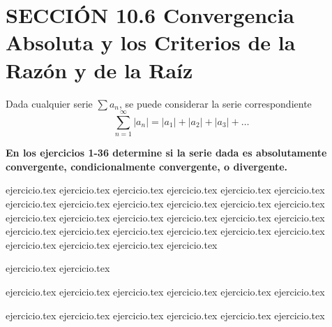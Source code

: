 
\section*{SECCIÓN 10.6 \quad Convergencia Absoluta y los Criterios de la Razón y de la Raíz}

Dada cualquier serie $\sum a_n$, se puede considerar la serie correspondiente
\[ \sum_{n=1}^{\infty} |a_n| = |a_1| + |a_2| + |a_3| + \dots \]

\vspace{0.5cm}
\noindent\textbf{En los ejercicios 1-36 determine si la serie dada es absolutamente convergente, condicionalmente convergente, o divergente.}
\begin{enumerate}
    {ejercicio.tex}
{ejercicio.tex}
{ejercicio.tex}
{ejercicio.tex}
{ejercicio.tex}
{ejercicio.tex}
{ejercicio.tex}
{ejercicio.tex}
{ejercicio.tex}
{ejercicio.tex}
{ejercicio.tex}
{ejercicio.tex}
{ejercicio.tex}
{ejercicio.tex}
{ejercicio.tex}
{ejercicio.tex}
{ejercicio.tex}
{ejercicio.tex}
{ejercicio.tex}
{ejercicio.tex}
{ejercicio.tex}
{ejercicio.tex}
{ejercicio.tex}
{ejercicio.tex}
{ejercicio.tex}
{ejercicio.tex}
{ejercicio.tex}
{ejercicio.tex}
\end{enumerate}

\vspace{0.3cm}
\begin{enumerate}
    \setcounter{enumi}{28}
    {ejercicio.tex}
{ejercicio.tex}
\end{enumerate}

\vspace{0.3cm}
\begin{enumerate}
    \setcounter{enumi}{30}
    {ejercicio.tex}
{ejercicio.tex}
{ejercicio.tex}
{ejercicio.tex}
{ejercicio.tex}
{ejercicio.tex}
\end{enumerate}

\vspace{0.5cm}
\begin{enumerate}
    \setcounter{enumi}{36}
    {ejercicio.tex}
{ejercicio.tex}
{ejercicio.tex}
{ejercicio.tex}
{ejercicio.tex}
{ejercicio.tex}
\end{enumerate}
